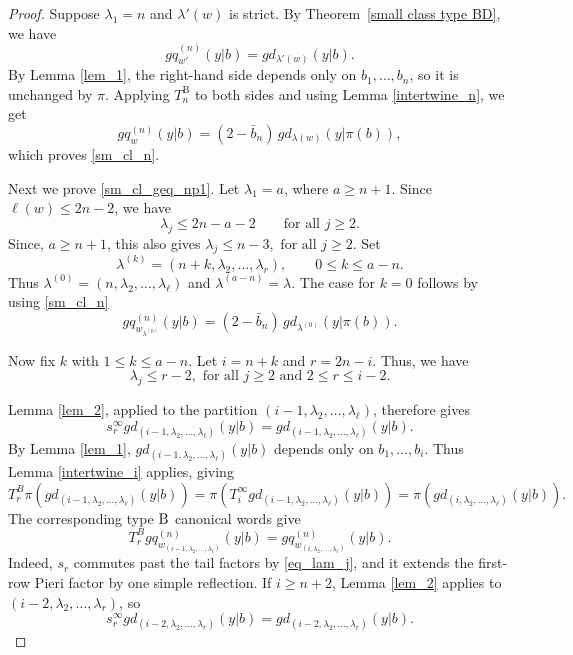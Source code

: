 \documentclass[a4paper]{amsart}
\newcommand{\koushik}[1]{\todo[size=\tiny,color=green!30]{#1}}
\theoremstyle{remark}
\numberwithin{equation}{section}
\begin{document}
\begin{proof}
Suppose $\lambda_1=n$ and $\lambda'(w)$ is strict. By Theorem~\ref{small class type BD}, we have
\[
    gq_{w'}^{(n)}(y| b)
    =
    gd_{\lambda'(w)}(y| b).
\]
By Lemma \ref{lem_1}, the right-hand side depends only on \(b_1,\ldots,b_n\), so it is unchanged by \(\pi\). Applying $T_n^{\mathrm{B}}$ to both sides and using Lemma \ref{intertwine_n}, we get
\[
    gq_w^{(n)}(y| b)
    =
    (2-\bar{b}_n)\,
    gd_{\lambda(w)}(y| \pi(b)),
\]
which proves \eqref{sm_cl_n}.

Next we prove \eqref{sm_cl_geq_np1}. Let $\lambda_1=a$, where $a\geq n+1$. Since $\ell(w)\leq 2n-2$, we have
\[\lambda_j\leq 2n-a-2
    \qquad \text{for all } j\geq 2.
\]
Since, $a\geq n+1$, this also gives $\lambda_j\leq n-3, \text{ for all } j\geq 2.$  Set
\[\lambda^{(k)}=(n+k,\lambda_2,\ldots,\lambda_r),
    \qquad 0\leq k\leq a-n.
\]
Thus $\lambda^{(0)}=(n,\lambda_2,\ldots,\lambda_\ell)$ and
$\lambda^{(a-n)}=\lambda$. The case for $k=0$ follows by using \eqref{sm_cl_n} 
\begin{equation}\label{eq_sm_gq}
     gq_{w_{\lambda^{(0)}}}^{(n)}(y| b)
    =
    (2-\bar{b}_n)\,
    gd_{\lambda^{(0)}}(y| \pi(b)).
\end{equation}
   

Now fix \(k\) with \(1\le k\le a-n\). Let $i=n+k$ and $
r=2n-i.$
Thus, we have
\begin{equation}\label{eq_lam_j}
  \lambda_j\le r-2, \text{ for all }j\ge 2\text{ and } 2\le r\le i-2. 
\end{equation}



Lemma \ref{lem_2}, applied to the partition \((i-1,\lambda_2,\dots,\lambda_\ell)\), therefore gives
\[
s_r^\infty gd_{(i-1,\lambda_2,\dots,\lambda_\ell)}(y| b)
=gd_{(i-1,\lambda_2,\dots,\lambda_\ell)}(y| b).
\]
By Lemma \ref{lem_1}, \(gd_{(i-1,\lambda_2,\dots,\lambda_\ell)}(y| b)\) depends only on \(b_1,\ldots,b_{i}\). Thus Lemma \ref{intertwine_i} applies, giving
\[
T_r^B \pi(gd_{(i-1,\lambda_2,\dots,\lambda_\ell)}(y| b))
=
\pi(T_i^\infty gd_{(i-1,\lambda_2,\dots,\lambda_\ell)}(y| b))
=
\pi(gd_{(i,\lambda_2,\dots,\lambda_\ell)}(y| b)).
\]
The corresponding type \(\mathrm{B}_{}\) canonical words give
\[T_r^B gq^{(n)}_{w_{(i-1,\lambda_2,\dots,\lambda_\ell)}}(y| b)=gq^{(n)}_{w_{(i,\lambda_2,\dots,\lambda_\ell)}}(y| b).
\]
Indeed, \(s_r\) commutes past the tail factors by \eqref{eq_lam_j}, and it extends the first-row Pieri factor by one simple reflection.
 If \(i\ge n+2\), Lemma \ref{lem_2} applies to \((i-2,\lambda_2,\dots,\lambda_r)\), so
\[
s_r^\infty gd_{(i-2,\lambda_2,\dots,\lambda_r)}(y| b)=gd_{(i-2,\lambda_2,\dots,\lambda_r)}(y| b).
\]






\end{proof}
\end{document}
